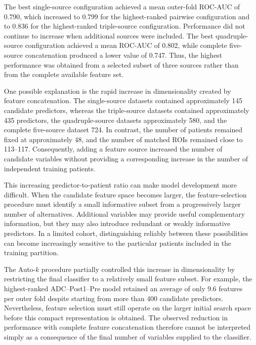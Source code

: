 \documentclass[12pt,twocolumn]{article}
\begin{document}
The best single-source configuration achieved a mean outer-fold
ROC-AUC of 0.790, which increased to 0.799 for the highest-ranked
pairwise configuration and to 0.836 for the highest-ranked
triple-source configuration. Performance did not continue to increase
when additional sources were included. The best quadruple-source
configuration achieved a mean ROC-AUC of 0.802, while complete
five-source concatenation produced a lower value of 0.747. Thus, the
highest performance was obtained from a selected subset of three
sources rather than from the complete available feature set.

One possible explanation is the rapid increase in dimensionality
created by feature concatenation. The single-source datasets contained
approximately 145 candidate predictors, whereas the triple-source
datasets contained approximately 435 predictors, the quadruple-source
datasets approximately 580, and the complete five-source dataset 724.
In contrast, the number of patients remained fixed at approximately
48, and the number of matched ROIs remained close to 113--117.
Consequently, adding a feature source increased the number of
candidate variables without providing a corresponding increase in the
number of independent training patients.

This increasing predictor-to-patient ratio can make model development
more difficult. When the candidate feature space becomes larger, the
feature-selection procedure must identify a small informative subset
from a progressively larger number of alternatives. Additional
variables may provide useful complementary information, but they may
also introduce redundant or weakly informative predictors. In a
limited cohort, distinguishing reliably between these possibilities
can become increasingly sensitive to the particular patients included
in the training partition.

The Auto-\(k\) procedure partially controlled this increase in
dimensionality by restricting the final classifier to a relatively
small feature subset. For example, the highest-ranked
ADC--Post1--Pre model retained an average of only 9.6 features per
outer fold despite starting from more than 400 candidate predictors.
Nevertheless, feature selection must still operate on the larger
initial search space before this compact representation is obtained.
The observed reduction in performance with complete feature
concatenation therefore cannot be interpreted simply as a consequence
of the final number of variables supplied to the classifier.
\end{document}
